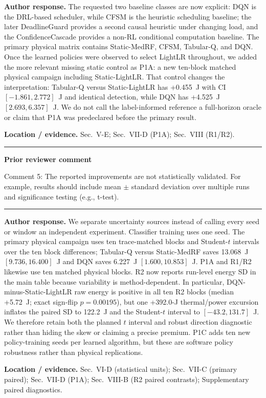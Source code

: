 \documentclass[11pt]{article}
\newenvironment{qbox}
    {\par\vspace{4pt}\noindent\begin{minipage}{\linewidth}\rule{\linewidth}{0.4pt}\par\noindent\textbf{Prior reviewer comment}\par\noindent}
    {\par\rule{\linewidth}{0.4pt}\end{minipage}\par\vspace{4pt}}
\begin{document}
\textbf{Author response.} The requested two baseline classes are now explicit: DQN is the DRL-based scheduler, while CFSM is the heuristic scheduling baseline; the later DeadlineGuard provides a second causal heuristic under changing load, and the ConfidenceCascade provides a non-RL conditional computation baseline. The primary physical matrix contains Static-MedRF, CFSM, Tabular-Q, and DQN. Once the learned policies were observed to select LightLR throughout, we added the more relevant missing static control as P1A: a new ten-block matched physical campaign including Static-LightLR. That control changes the interpretation: Tabular-Q versus Static-LightLR has +0.455~J with CI $[-1.861, 2.772]$~J and identical detection, while DQN has +4.525~J $[2.693, 6.357]$~J. We do not call the label-informed reference a full-horizon oracle or claim that P1A was predeclared before the primary result.

\textbf{Location / evidence.} Sec.~V-E; Sec.~VII-D (P1A); Sec.~VIII (R1/R2).

\begin{qbox}
Comment 5: The reported improvements are not statistically validated. For example, results should include mean $\pm$ standard deviation over multiple runs and significance testing (e.g., t-test).
\end{qbox}

\textbf{Author response.} We separate uncertainty sources instead of calling every seed or window an independent experiment. Classifier training uses one seed. The primary physical campaign uses ten trace-matched blocks and Student-$t$ intervals over the ten block differences; Tabular-Q versus Static-MedRF saves 13.068~J $[9.736, 16.400]$~J and DQN saves 6.227~J $[1.600, 10.853]$~J. P1A and R1/R2 likewise use ten matched physical blocks. R2 now reports run-level energy SD in the main table because variability is method-dependent. In particular, DQN-minus-Static-LightLR raw energy is positive in all ten R2 blocks (median +5.72~J; exact sign-flip $p=0.00195$), but one +392.0-J thermal/power excursion inflates the paired SD to 122.2~J and the Student-$t$ interval to $[-43.2, 131.7]$~J. We therefore retain both the planned $t$ interval and robust direction diagnostic rather than hiding the skew or claiming a precise premium. P1C adds ten new policy-training seeds per learned algorithm, but these are software policy robustness rather than physical replications.

\textbf{Location / evidence.} Sec.~VI-D (statistical units); Sec.~VII-C (primary paired); Sec.~VII-D (P1A); Sec.~VIII-B (R2 paired contrasts); Supplementary paired diagnostics.
\end{document}

